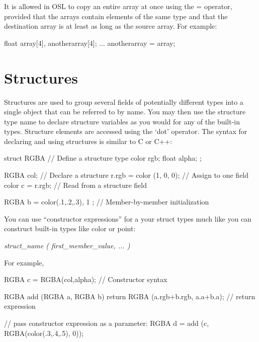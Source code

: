 \documentclass[11pt,letterpaper]{book}
\def\color{{\cf color}\xspace}
\def\point{{\cf point}\xspace}
\begin{document}
It is allowed in OSL to copy an entire array at once using the {\cf =}
operator, provided that the arrays contain elements of the same type
and that the destination array is at least as long as the source
array.  For example:

\begin{code}
    float array[4], anotherarray[4];
    ...
    anotherarray = array;
\end{code}


\section{Structures}
\label{sec:types:struct}
  

Structures are used to group several fields of potentially different
types into a single object that can be referred to by name.  You may
then use the structure type name to declare structure variables as you
would for any of the built-in types.  Structure elements are accessed
using the `dot' operator.  The syntax for declaring and using structures
is similar to C or C++:

\begin{code}
    struct RGBA {                    // Define a structure type
        color rgb;
        float alpha;
    };

    RGBA col;                        // Declare a structure
    r.rgb = color (1, 0, 0);         // Assign to one field
    color c = r.rgb;                 // Read from a structure field

    RGBA b = { color(.1,.2,.3), 1 }; // Member-by-member initialization
\end{code}

You can use ``constructor expressions'' for a your struct types much like
you can construct built-in types like \color or \point:

\vspace{10pt}
\hspace{0.25in} \emph{struct\_name ( first\_member\_value, ... )}
\vspace{10pt}

\noindent For example,

\begin{code}
    RGBA c = RGBA(col,alpha);        // Constructor syntax

    RGBA add (RGBA a, RGBA b)
    {
        return RGBA (a.rgb+b.rgb, a.a+b.a);   // return expression
    }

    // pass constructor expression as a parameter:
    RGBA d = add (c, RGBA(color(.3,.4,.5), 0));
\end{code}
\end{document}
